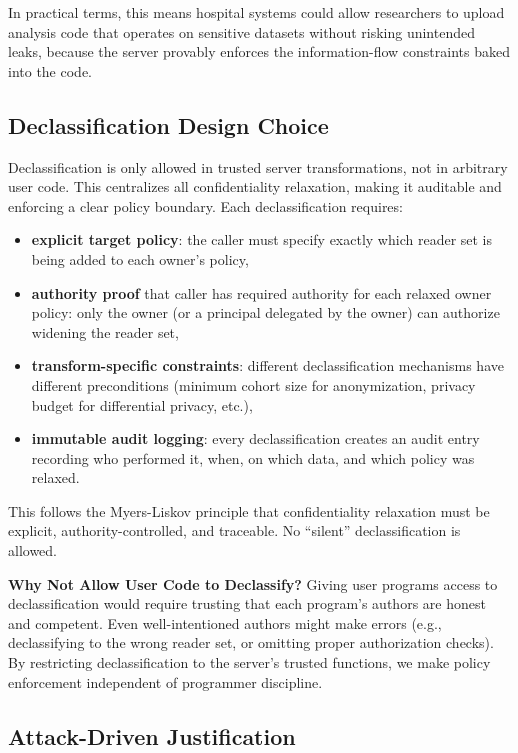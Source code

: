 In practical terms, this means hospital systems could allow researchers to upload analysis code that operates on sensitive datasets without risking unintended leaks, because the server provably enforces the information-flow constraints baked into the code.

\subsection{Declassification Design Choice}

Declassification is only allowed in trusted server transformations, not in arbitrary user code. This centralizes all confidentiality relaxation, making it auditable and enforcing a clear policy boundary. Each declassification requires:
\begin{itemize}
    \item \textbf{explicit target policy}: the caller must specify exactly which reader set is being added to each owner's policy,
    \item \textbf{authority proof} that caller has required authority for each relaxed owner policy: only the owner (or a principal delegated by the owner) can authorize widening the reader set,
    \item \textbf{transform-specific constraints}: different declassification mechanisms have different preconditions (minimum cohort size for anonymization, privacy budget for differential privacy, etc.),
    \item \textbf{immutable audit logging}: every declassification creates an audit entry recording who performed it, when, on which data, and which policy was relaxed.
\end{itemize}

This follows the Myers-Liskov principle that confidentiality relaxation must be explicit, authority-controlled, and traceable. No ``silent'' declassification is allowed.

\textbf{Why Not Allow User Code to Declassify?} Giving user programs access to declassification would require trusting that each program's authors are honest and competent. Even well-intentioned authors might make errors (e.g., declassifying to the wrong reader set, or omitting proper authorization checks). By restricting declassification to the server's trusted functions, we make policy enforcement independent of programmer discipline.

\subsection{Attack-Driven Justification}

